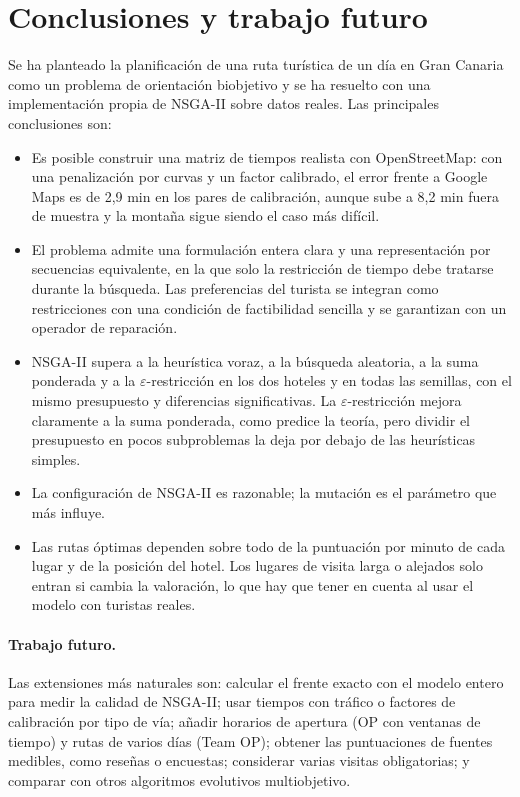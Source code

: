 \section{Conclusiones y trabajo futuro}
\label{sec:conclusiones}

Se ha planteado la planificación de una ruta turística de un día en Gran Canaria como un problema de orientación biobjetivo y se ha resuelto con una implementación propia de NSGA-II sobre datos reales. Las principales conclusiones son:

\begin{itemize}
  \item Es posible construir una matriz de tiempos realista con OpenStreetMap: con una penalización por curvas y un factor calibrado, el error frente a Google Maps es de 2,9 min en los pares de calibración, aunque sube a 8,2 min fuera de muestra y la montaña sigue siendo el caso más difícil.
  \item El problema admite una formulación entera clara y una representación por secuencias equivalente, en la que solo la restricción de tiempo debe tratarse durante la búsqueda. Las preferencias del turista se integran como restricciones con una condición de factibilidad sencilla y se garantizan con un operador de reparación.
  \item NSGA-II supera a la heurística voraz, a la búsqueda aleatoria, a la suma ponderada y a la $\varepsilon$-restricción en los dos hoteles y en todas las semillas, con el mismo presupuesto y diferencias significativas. La $\varepsilon$-restricción mejora claramente a la suma ponderada, como predice la teoría, pero dividir el presupuesto en pocos subproblemas la deja por debajo de las heurísticas simples.
  \item La configuración de NSGA-II es razonable; la mutación es el parámetro que más influye.
  \item Las rutas óptimas dependen sobre todo de la puntuación por minuto de cada lugar y de la posición del hotel. Los lugares de visita larga o alejados solo entran si cambia la valoración, lo que hay que tener en cuenta al usar el modelo con turistas reales.
\end{itemize}

\paragraph{Trabajo futuro.} Las extensiones más naturales son: calcular el frente exacto con el modelo entero para medir la calidad de NSGA-II; usar tiempos con tráfico o factores de calibración por tipo de vía; añadir horarios de apertura (OP con ventanas de tiempo) y rutas de varios días (Team OP); obtener las puntuaciones de fuentes medibles, como reseñas o encuestas; considerar varias visitas obligatorias; y comparar con otros algoritmos evolutivos multiobjetivo.
